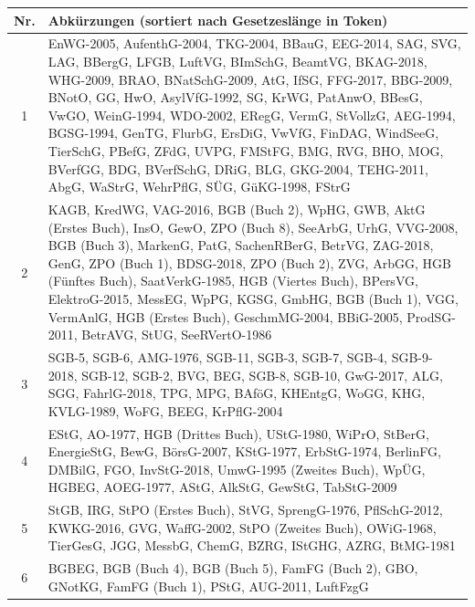 \begin{tabular}{cp{}}
    \textbf{Nr.} & \textbf{Abkürzungen (sortiert nach Gesetzeslänge in Token)} \\ \hline
1 & EnWG-2005, AufenthG-2004, TKG-2004, BBauG, EEG-2014, SAG, SVG, LAG, BBergG, LFGB, LuftVG, BImSchG, BeamtVG, BKAG-2018, WHG-2009, BRAO, BNatSchG-2009, AtG, IfSG, FFG-2017, BBG-2009, BNotO, GG, HwO, AsylVfG-1992, SG, KrWG, PatAnwO, BBesG, VwGO, WeinG-1994, WDO-2002, ERegG, VermG, StVollzG, AEG-1994, BGSG-1994, GenTG, FlurbG, ErsDiG, VwVfG, FinDAG, WindSeeG, TierSchG, PBefG, ZFdG, UVPG, FMStFG, BMG, RVG, BHO, MOG, BVerfGG, BDG, BVerfSchG, DRiG, BLG, GKG-2004, TEHG-2011, AbgG, WaStrG, WehrPflG, SÜG, GüKG-1998, FStrG \\ \hline
2 & KAGB, KredWG, VAG-2016, BGB (Buch 2), WpHG, GWB, AktG (Erstes Buch), InsO, GewO, ZPO (Buch 8), SeeArbG, UrhG, VVG-2008, BGB (Buch 3), MarkenG, PatG, SachenRBerG, BetrVG, ZAG-2018, GenG, ZPO (Buch 1), BDSG-2018, ZPO (Buch 2), ZVG, ArbGG, HGB (Fünftes Buch), SaatVerkG-1985, HGB (Viertes Buch), BPersVG, ElektroG-2015, MessEG, WpPG, KGSG, GmbHG, BGB (Buch 1), VGG, VermAnlG, HGB (Erstes Buch), GeschmMG-2004, BBiG-2005, ProdSG-2011, BetrAVG, StUG, SeeRVertO-1986 \\ \hline
3 & SGB-5, SGB-6, AMG-1976, SGB-11, SGB-3, SGB-7, SGB-4, SGB-9-2018, SGB-12, SGB-2, BVG, BEG, SGB-8, SGB-10, GwG-2017, ALG, SGG, FahrlG-2018, TPG, MPG, BAföG, KHEntgG, WoGG, KHG, KVLG-1989, WoFG, BEEG, KrPflG-2004 \\ \hline
4 & EStG, AO-1977, HGB (Drittes Buch), UStG-1980, WiPrO, StBerG, EnergieStG, BewG, BörsG-2007, KStG-1977, ErbStG-1974, BerlinFG, DMBilG, FGO, InvStG-2018, UmwG-1995 (Zweites Buch), WpÜG, HGBEG, AOEG-1977, AStG, AlkStG, GewStG, TabStG-2009 \\ \hline
5 & StGB, IRG, StPO (Erstes Buch), StVG, SprengG-1976, PflSchG-2012, KWKG-2016, GVG, WaffG-2002, StPO (Zweites Buch), OWiG-1968, TierGesG, JGG, MessbG, ChemG, BZRG, IStGHG, AZRG, BtMG-1981 \\ \hline
6 & BGBEG, BGB (Buch 4), BGB (Buch 5), FamFG (Buch 2), GBO, GNotKG, FamFG (Buch 1), PStG, AUG-2011, LuftFzgG \\
    \end{tabular}
    
